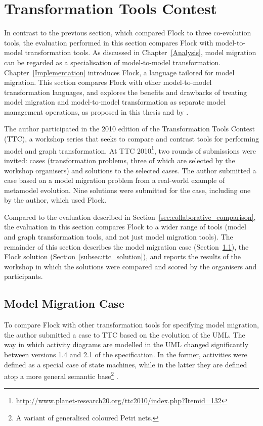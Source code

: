 
\section{Transformation Tools Contest}
\label{sec:ttc}
In contrast to the previous section, which compared Flock to three co-evolution tools, the evaluation performed in this section compares Flock with model-to-model transformation tools. As discussed in Chapter~\ref{Analysis}, model migration can be regarded as a specialisation of model-to-model transformation. Chapter~\ref{Implementation} introduces Flock, a language tailored for model migration. This section compares Flock with other model-to-model transformation languages, and explores the benefits and drawbacks of treating model migration and model-to-model transformation as separate model management operations, as proposed in this thesis and by \cite{sprinkle03thesis}.

The author participated in the 2010 edition of the Transformation Tools Contest (TTC), a workshop series that seeks to compare and contrast tools for performing model and graph transformation. At TTC 2010\footnote{\url{http://www.planet-research20.org/ttc2010/index.php?Itemid=132}}, two rounds of submissions were invited: cases (transformation problems, three of which are selected by the workshop organisers) and solutions to the selected cases. The author submitted a case based on a model migration problem from a real-world example of metamodel evolution. Nine solutions were submitted for the case, including one by the author, which used Flock.

Compared to the evaluation described in Section~\ref{sec:collaborative_comparison}, the evaluation in this section compares Flock to a wider range of tools (model and graph transformation tools, and not just model migration tools). The remainder of this section describes the model migration case (Section~\ref{subsec:ttc_case}), the Flock solution (Section~\ref{subsec:ttc_solution}), and reports the results of the workshop in which the solutions were compared and scored by the organisers and participants.


\subsection{Model Migration Case}
\label{subsec:ttc_case}
To compare Flock with other transformation tools for specifying model migration, the author submitted a case to TTC based on the evolution of the UML. The way in which activity diagrams are modelled in the UML changed significantly between versions 1.4 and 2.1 of the specification. In the former, activities were defined as a special case of state machines, while in the latter they are defined atop a more general semantic base\footnote{A variant of generalised coloured Petri nets.} \cite{selic05uml2}.

